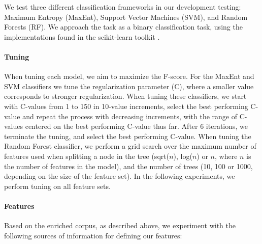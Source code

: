 \documentclass[11pt,letterpaper]{article}
\begin{document}
We test three different classification frameworks in our development testing: Maximum Entropy (MaxEnt), Support Vector Machines (SVM), and Random Forests (RF).  We approach the task as a binary classification task, using the implementations found in the scikit-learn toolkit \cite{scikit-learn}.

\paragraph{Tuning}
When tuning each model, we aim to maximize the F-score. For the MaxEnt and SVM classifiers we tune the regularization parameter (C), where a smaller value corresponds to stronger regularization. When tuning these classifiers, we start with C-values from 1 to 150 in 10-value increments, select the best performing C-value and repeat the process with decreasing increments, with the range of C-values centered on the best performing C-value thus far. After 6 iterations, we terminate the tuning, and select the best performing C-value. When tuning the Random Forest classifier, we perform a grid search over the maximum number of features used when splitting a node in the tree (sqrt($n$), log($n$) or $n$, where $n$ is the number of features in the model), and the number of trees (10, 100 or 1000, depending on the size of the feature set). In the following experiments, we perform tuning on all feature sets.


\paragraph{Features}
Based on the enriched corpus, as described above, we experiment with the following sources of information for defining our features:
\end{document}
